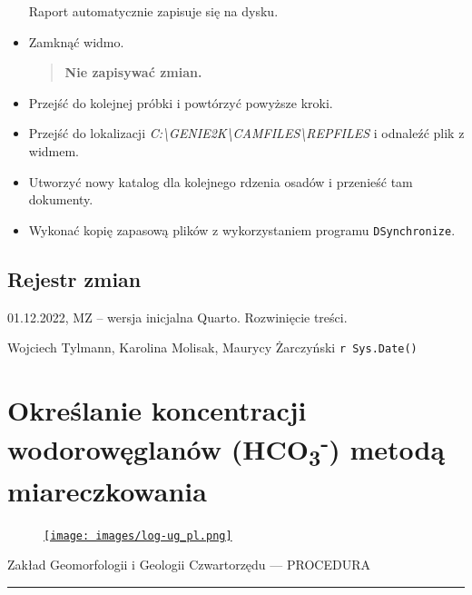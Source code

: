 \documentclass[
  letterpaper,
  DIV=11,
  numbers=noendperiod]{scrreprt}
\begin{document}
\begin{itemize}
  Raport automatycznie zapisuje się na dysku.
\item
  Zamknąć widmo.

  \begin{quote}
  \textbf{Nie zapisywać zmian.}
  \end{quote}
\item
  Przejść do kolejnej próbki i powtórzyć powyższe kroki.
\item
  Przejść do lokalizacji
  \emph{C:\textbackslash GENIE2K\textbackslash CAMFILES\textbackslash REPFILES}
  i odnaleźć plik z widmem.
\item
  Utworzyć nowy katalog dla kolejnego rdzenia osadów i przenieść tam
  dokumenty.
\item
  Wykonać kopię zapasową plików z wykorzystaniem programu
  \texttt{DSynchronize}.
\end{itemize}

\hypertarget{rejestr-zmian-8}{%
\section{Rejestr zmian}\label{rejestr-zmian-8}}

01.12.2022, MZ -- wersja inicjalna Quarto. Rozwinięcie treści.

Wojciech Tylmann, Karolina Molisak, Maurycy Żarczyński
\texttt{r\ Sys.Date()}

\hypertarget{okreux15blanie-koncentracji-wodorowux119glanuxf3w-hco3--metodux105-miareczkowania}{%
\chapter{\texorpdfstring{Określanie koncentracji wodorowęglanów
(HCO\textsubscript{3}\textsuperscript{-}) metodą
miareczkowania}{Określanie koncentracji wodorowęglanów (HCO3-) metodą miareczkowania}}\label{okreux15blanie-koncentracji-wodorowux119glanuxf3w-hco3--metodux105-miareczkowania}}

\begin{figure}

\href{https://geomorfologia.ug.edu.pl}{\texttt{[image: images/log-ug\_pl.png]}}

\end{figure}

Zakład Geomorfologii i Geologii Czwartorzędu --- PROCEDURA

\begin{center}\rule{0.5\linewidth}{0.5pt}\end{center}
\end{document}
